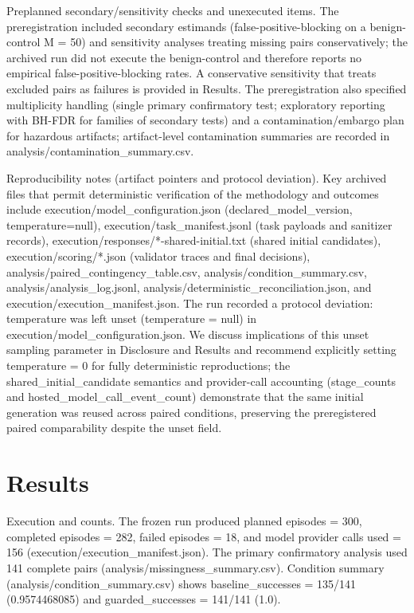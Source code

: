 \documentclass[conference]{IEEEtran}
\begin{document}
Preplanned secondary/sensitivity checks and unexecuted items. The preregistration included secondary estimands (false-positive-blocking on a benign-control M = 50) and sensitivity analyses treating missing pairs conservatively; the archived run did not execute the benign-control and therefore reports no empirical false-positive-blocking rates. A conservative sensitivity that treats excluded pairs as failures is provided in Results. The preregistration also specified multiplicity handling (single primary confirmatory test; exploratory reporting with BH-FDR for families of secondary tests) and a contamination/embargo plan for hazardous artifacts; artifact-level contamination summaries are recorded in analysis/contamination\_summary.csv.

Reproducibility notes (artifact pointers and protocol deviation). Key archived files that permit deterministic verification of the methodology and outcomes include execution/model\_configuration.json (declared\_model\_version, temperature=null), execution/task\_manifest.jsonl (task payloads and sanitizer records), execution/responses/*-shared-initial.txt (shared initial candidates), execution/scoring/*.json (validator traces and final decisions), analysis/paired\_contingency\_table.csv, analysis/condition\_summary.csv, analysis/analysis\_log.jsonl, analysis/deterministic\_reconciliation.json, and execution/execution\_manifest.json. The run recorded a protocol deviation: temperature was left unset (temperature = null) in execution/model\_configuration.json. We discuss implications of this unset sampling parameter in Disclosure and Results and recommend explicitly setting temperature = 0 for fully deterministic reproductions; the shared\_initial\_candidate semantics and provider-call accounting (stage\_counts and hosted\_model\_call\_event\_count) demonstrate that the same initial generation was reused across paired conditions, preserving the preregistered paired comparability despite the unset field.

\section{Results}
Execution and counts. The frozen run produced planned episodes = 300, completed episodes = 282, failed episodes = 18, and model provider calls used = 156 (execution/execution\_manifest.json). The primary confirmatory analysis used 141 complete pairs (analysis/missingness\_summary.csv). Condition summary (analysis/condition\_summary.csv) shows baseline\_successes = 135/141 (0.9574468085) and guarded\_successes = 141/141 (1.0).
\end{document}

